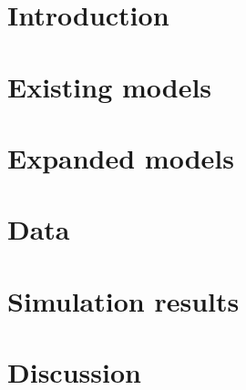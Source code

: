 \documentclass[10pt]{amsart}
\title{}
\author{Dylan Murphy}
\date{\today}
\begin{document}
\maketitle

\begin{abstract}

\end{abstract}

\section{Introduction}

\section{Existing models}

\section{Expanded models}

\section{Data}

\section{Simulation results}

\section{Discussion}
\end{document}
